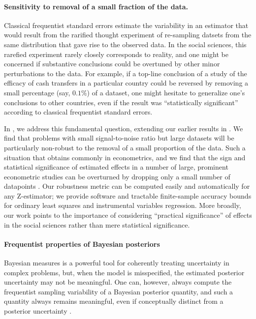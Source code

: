 \paragraph{Sensitivity to removal of a small fraction of the data.} Classical
frequentist standard errors estimate the variability in an estimator that would
result from the rarified thought experiment of re-sampling datsets from the same
distribution that gave rise to the observed data.  In the social sciences, this
rarefied experiment rarely closely corresponds to reality, and one might be
concerned if substantive conclusions could be overtuned by other minor
perturbations to the data.  For example, if a top-line conclusion of a study of
the efficacy of cash transfers in a particular country
\citep{angelucci:2009:indirect} could be reversed by removing a small percentage
(say, $0.1\%$) of a dataset, one might hesitate to generalize one's conclusions
to other countries, even if the result was ``statistically significant''
according to classical frequentist standard errors.

In \citet{giordano:2020:amip}, we address this fundamental question, extending
our earlier results in \citet{giordano:2019:ij}.  We find that problems with
small signal-to-noise ratio but large datasets will be particularly non-robust
to the removal of a small proportion of the data. Such a situation that obtains
commonly in econometrics, and we find that the sign and statistical significance
of estimated effects in a number of large, prominent econometric studies can be
overturned by dropping only a small number of datapoints
\citep{angelucci:2009:indirect, finkelstein:2012:oregon}.  Our robustness metric
can be computed easily and automatically for any Z-estimator; we provide
software and tractable finite-sample accuracy bounds for ordinary least squares
and instrumental variables regression.  More broadly, our work points to the
importance of considering ``practical significance'' of effects in the social
sciences rather than mere statistical significance.


\paragraph{Frequentist properties of Bayesian posteriors}

Bayesian measures is a powerful tool for coherently treating uncertainty in
complex problems, but, when the model is misspecified, the estimated  posterior
uncertainty may not be meaningful.  One can, however, always compute the
frequentist sampling variability of a Bayesian posterior quantity, and such a
quantity always remains meaningful, even if conceptually distinct from a
posterior uncertainty \citet{waddell:2002:bayesphyloboot,
kleijn:2006:misspecification, huggins:2019:bayesbag}.

